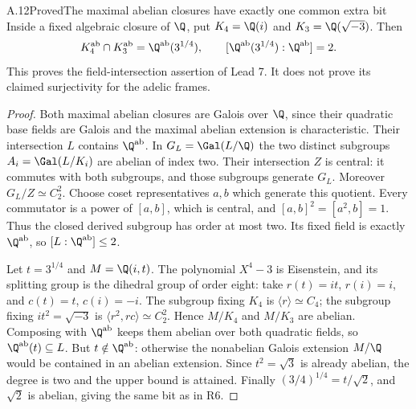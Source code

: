 \begin{statement}{A.12}{Proved}{The maximal abelian closures have exactly one common extra bit}
Inside a fixed algebraic closure of $\Q$, put
$K_4=\Q(i)$ and $K_3=\Q(\sqrt{-3})$. Then
\[
 K_4^{\rm ab}\cap K_3^{\rm ab}
       =\Q^{\rm ab}(3^{1/4}),\qquad
 [\Q^{\rm ab}(3^{1/4}):\Q^{\rm ab}]=2.
\]
This proves the field-intersection assertion of Lead 7. It
does not prove its claimed surjectivity for the adelic frames.
\end{statement}
\begin{proof}
Both maximal abelian closures are Galois over $\Q$, since
their quadratic base fields are Galois and the maximal
abelian extension is characteristic. Their intersection $L$
contains $\Q^{\rm ab}$. In $G_L=\Gal(L/\Q)$ the two
distinct subgroups $A_i=\Gal(L/K_i)$ are abelian of index
two. Their intersection $Z$ is central: it commutes with
both subgroups, and those subgroups generate $G_L$.
Moreover $G_L/Z\simeq C_2^2$. Choose coset representatives
$a,b$ which generate this quotient. Every commutator is
a power of $[a,b]$, which is central, and
$[a,b]^2=[a^2,b]=1$. Thus the closed derived subgroup
has order at most two. Its fixed field is exactly
$\Q^{\rm ab}$, so $[L:\Q^{\rm ab}]\le2$.

Let $t=3^{1/4}$ and $M=\Q(i,t)$. The polynomial $X^4-3$
is Eisenstein, and its splitting group is the dihedral group
of order eight: take $r(t)=it$, $r(i)=i$, and
$c(t)=t$, $c(i)=-i$. The subgroup fixing $K_4$ is
$\langle r\rangle\simeq C_4$; the subgroup fixing
$it^2=\sqrt{-3}$ is $\langle r^2,rc\rangle\simeq C_2^2$.
Hence $M/K_4$ and $M/K_3$ are abelian. Composing with
$\Q^{\rm ab}$ keeps them abelian over both quadratic fields,
so $\Q^{\rm ab}(t)\subseteq L$. But $t\notin\Q^{\rm ab}$:
otherwise the nonabelian Galois extension $M/\Q$ would be
contained in an abelian extension. Since $t^2=\sqrt3$ is
already abelian, the degree is two and the upper bound is
attained. Finally $(3/4)^{1/4}=t/\sqrt2$, and $\sqrt2$
is abelian, giving the same bit as in R6.
\end{proof}

